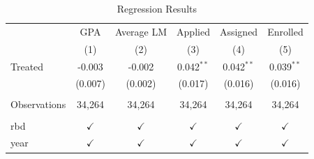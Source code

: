 \begin{table}[htbp]
   \caption{\label{tab:reg_results} Regression Results}
   \bigskip
   \centering
   \begin{tabular}{lccccc}
      \toprule
                   & GPA           & Average LM    & Applied       & Assigned      & Enrolled\\  
                   & (1)           & (2)           & (3)           & (4)           & (5)\\  
      \midrule 
      Treated      & -0.003        & -0.002        & 0.042$^{**}$  & 0.042$^{**}$  & 0.039$^{**}$\\   
                   & (0.007)       & (0.002)       & (0.017)       & (0.016)       & (0.016)\\   
       \\
      Observations & 34,264        & 34,264        & 34,264        & 34,264        & 34,264\\  
       \\
      rbd          & $\checkmark$  & $\checkmark$  & $\checkmark$  & $\checkmark$  & $\checkmark$\\   
      year         & $\checkmark$  & $\checkmark$  & $\checkmark$  & $\checkmark$  & $\checkmark$\\   
      \bottomrule
   \end{tabular}
\end{table}
